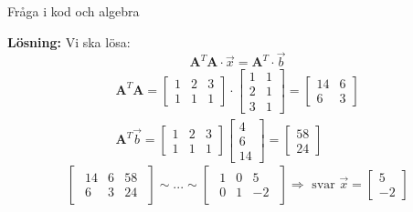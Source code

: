 \begin{Ex}
    \begin{center}
        Fråga i kod och algebra
    \end{center}
    \textbf{Lösning: } Vi ska lösa:
    \[
        \mathbf{A}^T \mathbf{A} \cdot \vec{x} = \mathbf{A}^T \cdot \vec{b}
    \]
    \begin{gather*}
        \mathbf{A}^T \mathbf{A} =
        \begin{bmatrix}
            1 & 2 & 3\\
            1 & 1 & 1
        \end{bmatrix} \cdot
        \begin{bmatrix}
            1 & 1\\
            2 & 1\\
            3 & 1
        \end{bmatrix} =
        \begin{bmatrix}
            14 & 6\\
            6 & 3
        \end{bmatrix} \\
        \mathbf{A}^T \vec{b} =
        \begin{bmatrix}
            1 & 2 & 3\\
            1 & 1 & 1
        \end{bmatrix}
        \begin{bmatrix}
            4 \\
            6 \\
            14
        \end{bmatrix} =
        \begin{bmatrix}
            58 \\
            24
        \end{bmatrix}
        \end{gather*}
        \[
            \begin{bmatrix}
            \begin{array}{cc|c}
                14 & 6 & 58\\
                6 & 3 & 24
            \end{array}
            \end{bmatrix}
            \sim ... \sim
            \begin{bmatrix}
            \begin{array}{cc|c}
                1 & 0 & 5\\
                0 & 1 & -2
            \end{array}
            \end{bmatrix}
            \Rightarrow \mbox{ svar } \vec{x} =
            \begin{bmatrix}
                5\\
                -2
            \end{bmatrix}
        \]

\end{Ex}

